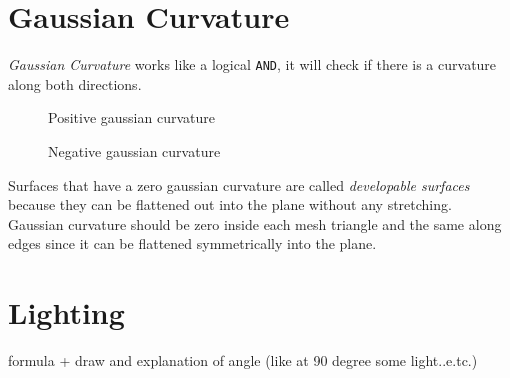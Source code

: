 \section{Gaussian Curvature}
\textit{Gaussian Curvature} works like a logical \texttt{AND}, it will check if there is a curvature along both directions.

\begin{figure}[h]
  \centering
  \caption{Positive gaussian curvature}\label{fig:positive-gaussian}
  \endminipage
  \centering
  \caption{Negative gaussian curvature}\label{fig:negative-gaussian}
  \endminipage
\end{figure}
Surfaces that have a zero gaussian curvature are called \textit{developable surfaces} because they can be flattened out into the plane without any stretching. Gaussian curvature should be zero inside each mesh triangle and the same along edges since it can be flattened symmetrically into the plane.


\section{Lighting}
formula + draw and explanation of angle (like at 90 degree some light..e.tc.)